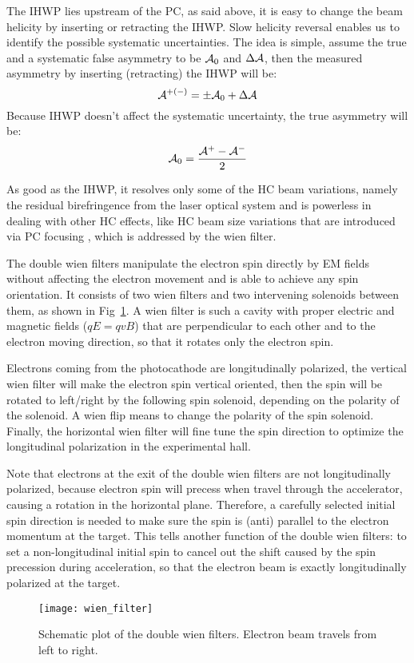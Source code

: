 The IHWP lies upstream of the PC, as said above, it is easy to change the beam 
helicity by inserting or retracting the IHWP. Slow helicity reversal enables us 
to identify the possible systematic uncertainties. The idea is simple, 
assume the true and a systematic false asymmetry to be $\mathcal{A}_0$ and $\Delta \mathcal{A}$,
then the measured asymmetry by inserting (retracting) the IHWP will be:
\begin{equation}
    \mathcal{A}^{+(-)} = \pm \mathcal{A}_0  + \Delta \mathcal{A}
\end{equation}
Because IHWP doesn't affect the systematic uncertainty, the true asymmetry will be:
\begin{equation}
    \mathcal{A}_0 = \frac{\mathcal{A}^+ - \mathcal{A}^-}{2}
\end{equation}

As good as the IHWP, it resolves only some of the HC beam variations, namely
the residual birefringence from the laser optical system and is powerless in dealing
with other HC effects, like HC beam size variations that are introduced via
PC focusing \cite{osti_1059486}, which is addressed by the wien filter.

The double wien filters manipulate the electron spin directly by EM fields 
without affecting the electron movement and is able to achieve any spin orientation.
It consists of two wien filters and two intervening solenoids between them, as
shown in Fig~\ref{fig:double_wien_filters}.
A wien filter is such a cavity with proper electric and magnetic fields ($qE = qvB$)
that are perpendicular to each other and to the electron moving direction, so that it 
rotates only the electron spin.

Electrons coming from the photocathode are longitudinally polarized,
the vertical wien filter will make the electron spin vertical oriented, then the
spin will be rotated to left/right by the following spin solenoid, depending on
the polarity of the solenoid. A wien flip means to change the polarity of the spin solenoid.
Finally, the horizontal wien filter will fine tune the spin direction to optimize 
the longitudinal polarization in the experimental hall. 

Note that electrons at the exit of the double wien filters are not longitudinally polarized, 
because electron spin will precess when travel through the accelerator, causing a rotation 
in the horizontal plane. Therefore, a carefully selected initial spin direction is 
needed to make sure the spin is (anti) parallel to the electron momentum at the target.
This tells another function of the double wien filters: to set a non-longitudinal 
initial spin to cancel out the shift caused by the spin precession during acceleration, 
so that the electron beam is exactly longitudinally polarized at the target.
\begin{figure}[!h]
    \centering
    \texttt{[image: wien\_filter]}
    \caption{Schematic plot of the double wien filters. Electron beam travels from left
    to right. \cite{osti_1059486}}
    \label{fig:double_wien_filters}
\end{figure}

